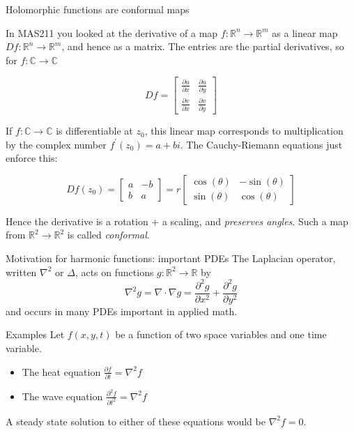 \documentclass{beamer}
\newcommand{\C}{\mathbb{C}}
\newcommand{\R}{\mathbb{R}}
\begin{document}
\begin{frame}{Holomorphic functions are conformal maps}

  In MAS211 you looked at the derivative of a map $f:\R^n\to\R^m$ as a linear map $Df:\R^n\to\R^m$, and hence as a matrix.  The entries are the partial derivatives, so for $f:\C\to\C$

  $$Df=\begin{bmatrix}\frac{\partial u}{\partial x} & \frac{\partial u}{\partial y} \\ \frac{\partial v}{\partial x} & \frac{\partial v}{\partial y} \end{bmatrix}$$

  If $f:\C\to\C$ is differentiable at $z_0$, this linear map corresponds to multiplication by the complex number $f^\prime(z_0)=a+bi$. The Cauchy-Riemann equations just enforce this: 

$$Df(z_0)=\begin{bmatrix} a & -b \\ b & a \end{bmatrix}=r\begin{bmatrix} \cos(\theta) & -\sin(\theta) \\ \sin(\theta) & \cos(\theta)\end{bmatrix}$$

Hence the derivative is a rotation + a scaling, and \emph{preserves angles}. Such a map from $\R^2\to\R^2$ is called \emph{conformal}.


    \end{frame}

\begin{frame}{Motivation for harmonic functions: important PDEs}
The Laplacian operator, written $\nabla^2$ or $\Delta$, acts on functions $g:\R^2\to\R$ by
$$\nabla^2g=\nabla\cdot\nabla g=\frac{\partial^2 g}{\partial x^2}+\frac{\partial^2 g}{\partial y^2}$$
and occurs in many PDEs important in applied math.  

\begin{block}{Examples}
Let $f(x,y,t)$ be a function of two space variables and one time variable.
\begin{itemize}
    \item The heat equation $\frac{\partial f}{\partial t}=\nabla^2f$
    \item The wave equation $\frac{\partial^2 f}{\partial t^2}=\nabla^2f$
\end{itemize}
\end{block}
A steady state solution to either of these equations would be $\nabla^2f=0$.  
\end{frame}
\end{document}
